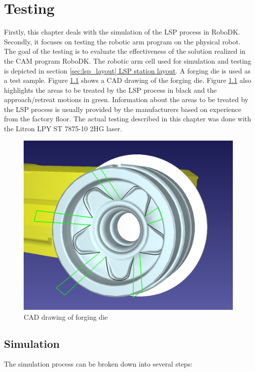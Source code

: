 \chapter{Testing \label{chap:testing}}

\label{chap:testing}

Firstly, this chapter deals with the simulation of the LSP process in RoboDK. Secondly, it focuses on testing the robotic arm program on the physical robot. The goal of the testing is to evaluate the effectiveness of the solution realized in the CAM program RoboDK. The robotic arm cell used for simulation and testing is depicted in section \hyperref[sec:lsp_layout]{\ref{sec:lsp_layout} LSP station layout}. A forging die is used as a test sample. Figure \ref{fig:cad} shows a CAD drawing of the forging die. Figure \ref{fig:cad} also highlights the areas to be treated by the LSP process in black and the approach/retreat motions in green. Information about the areas to be treated by the LSP process is usually provided by the manufacturers based on experience from the factory floor. The actual testing described in this chapter was done with the Litron LPY ST 7875-10 2HG laser. 

\begin{figure}[h]
    \centering
    \includegraphics[width=0.8\linewidth]{img/cad.PNG}
    \caption{CAD drawing of forging die}
    \label{fig:cad}
\end{figure}

\section{Simulation}

The simulation process can be broken down into several steps:

